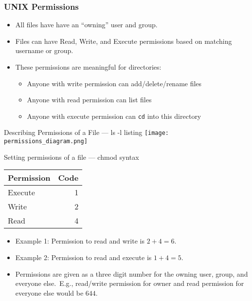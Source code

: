 \documentclass[xcolor={usenames,x11names}]{beamer}
\begin{document}
\begin{frame}[fragile]
\frametitle{UNIX Permissions}
 \begin{itemize}
  \item All files have have an ``owning'' user and group.
  \pause\item Files can have Read, Write, and Execute permissions based on matching username or group.
  \pause\item These permissions are meaningful for directories:\begin{itemize}
                                                       \item Anyone with write permission can add/delete/rename files
                                                       \item Anyone with read permission can list files
                                                       \item Anyone with execute permission can \verb|cd| into this directory
                                                      \end{itemize}
 \end{itemize}
\end{frame}

\begin{frame}{Describing Permissions of a File --- ls -l listing}
  \centering\texttt{[image: permissions\_diagram.png]}
\end{frame}

\begin{frame}{Setting permissions of a file --- chmod syntax}
\begin{center}
 \begin{tabular}{lr}
  \toprule
  \textbf{Permission} & \textbf{Code} \\
  \midrule
  Execute & 1 \\ \midrule
  Write & 2 \\ \midrule
  Read & 4 \\
  \bottomrule
 \end{tabular}
\end{center}
\begin{itemize}
 \pause\item Example 1: Permission to read and write is $2+4 = 6$.
 \pause\item Example 2: Permission to read and execute is $1 + 4 = 5$.
 \pause\item Permissions are given as a three digit number for the owning user, group, and everyone else.\pause\ E.g., read/write permission for owner and read permission for everyone else would be $644$.
\end{itemize}
\end{frame}
\end{document}
